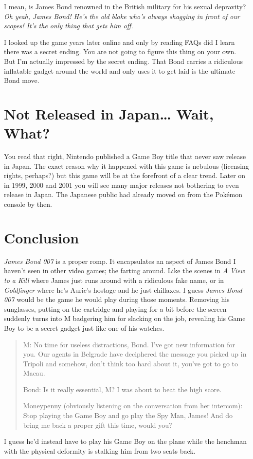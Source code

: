 \documentclass{book}
\begin{document}
\par\justifying
I mean, is James Bond renowned in the British military for his sexual depravity? \emph{Oh yeah, James Bond! He’s the old bloke who’s always shagging in front of our scopes! It’s the only thing that gets him off.}\par
I looked up the game years later online and only by reading FAQs did I learn there was a secret ending. You are not going to figure this thing on your own. But I’m actually impressed by the secret ending. That Bond carries a ridiculous inflatable gadget around the world and only uses it to get laid is the ultimate Bond move.\par
\FloatBarrier\section*{Not Released in Japan… Wait, What?}
You read that right, Nintendo published a Game Boy title that never saw release in Japan. The exact reason why it happened with this game is nebulous (licensing rights, perhaps?) but this game will be at the forefront of a clear trend. Later on in 1999, 2000 and 2001 you will see many major releases not bothering to even release in Japan. The Japanese public had already moved on from the Pokémon console by then.\par
\FloatBarrier\section*{Conclusion}
\emph{James Bond 007} is a proper romp. It encapsulates an aspect of James Bond I haven’t seen in other video games; the farting around. Like the scenes in \emph{A View to a Kill} where James just runs around with a ridiculous fake name, or in \emph{Goldfinger} where he’s Auric’s hostage and he just chillaxes. I guess \emph{James Bond 007} would be the game he would play during those moments. Removing his sunglasses, putting on the cartridge and playing for a bit before the screen suddenly turns into M badgering him for slacking on the job, revealing his Game Boy to be a secret gadget just like one of his watches.\par
\begin{quote}
M: No time for useless distractions, Bond. I’ve got new information for you. Our agents in Belgrade have deciphered the message you picked up in Tripoli and somehow, don’t think too hard about it, you’ve got to go to Macau.\par
Bond: Is it really essential, M? I was about to beat the high score.\par
Moneypenny (obviously listening on the conversation from her intercom): Stop playing the Game Boy and go play the Spy Man, James! And do bring me back a proper gift this time, would you?\par
\end{quote} \par
I guess he’d instead have to play his Game Boy on the plane while the henchman with the physical deformity is stalking him from two seats back.\par
\end{document}

